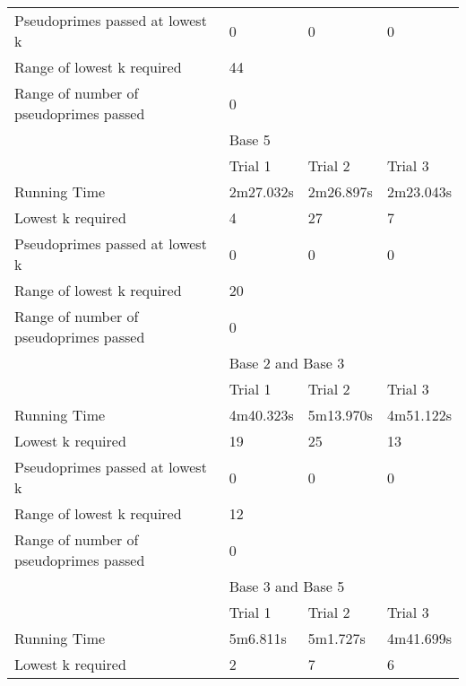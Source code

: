 \documentclass{article}
\begin{document}
\begin{appendices}
\begin{table}[h]
\begin{tabular}{@{}llll@{}}
Pseudoprimes passed at lowest k        & 0           & 0          & 0          \\\cmidrule(lr){2-4}
Range of lowest k required             & \multicolumn{3}{l}{44}                \\
Range of number of pseudoprimes passed & \multicolumn{3}{l}{0}                 \\\midrule
                                       & \multicolumn{3}{l}{Base 5}            \\\midrule
                                       & Trial 1     & Trial 2    & Trial 3    \\
Running Time                           & 2m27.032s   & 2m26.897s  & 2m23.043s  \\
Lowest k required                      & 4           & 27         & 7          \\
Pseudoprimes passed at lowest k        & 0           & 0          & 0          \\\cmidrule(lr){2-4}
Range of lowest k required             & \multicolumn{3}{l}{20}                \\
Range of number of pseudoprimes passed & \multicolumn{3}{l}{0}                 \\\midrule
                                       & \multicolumn{3}{l}{Base 2 and Base 3} \\\midrule 
                                       & Trial 1     & Trial 2    & Trial 3    \\
Running Time                           & 4m40.323s   & 5m13.970s  & 4m51.122s  \\
Lowest k required                      & 19          & 25         & 13         \\
Pseudoprimes passed at lowest k        & 0           & 0          & 0          \\\cmidrule(lr){2-4}
Range of lowest k required             & \multicolumn{3}{l}{12}                \\
Range of number of pseudoprimes passed & \multicolumn{3}{l}{0}                 \\\midrule
                                       & \multicolumn{3}{l}{Base 3 and Base 5} \\\midrule
                                       & Trial 1     & Trial 2    & Trial 3    \\
Running Time                           & 5m6.811s    & 5m1.727s   & 4m41.699s  \\
Lowest k required                      & 2           & 7          & 6          \\

\end{tabular}
\end{table}
\end{appendices}
\end{document}
